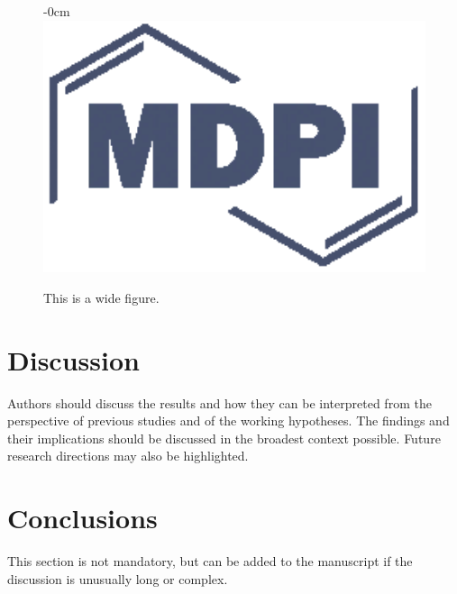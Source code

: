 \documentclass[mathematics,article,submit,pdftex,moreauthors]{Definitions/mdpi}
\begin{document}
\begin{figure}[H]
\begin{adjustwidth}{-\extralength}{0cm}
\centering
\includegraphics[width=13.5cm]{Definitions/logo-mdpi}
\end{adjustwidth}
\caption{This is a wide figure.\label{fig2}}
\end{figure}  



\section{Discussion}

Authors should discuss the results and how they can be interpreted from the perspective of previous studies and of the working hypotheses. The findings and their implications should be discussed in the broadest context possible. Future research directions may also be highlighted.

\section{Conclusions}

This section is not mandatory, but can be added to the manuscript if the discussion is unusually long or complex.

\end{document}
